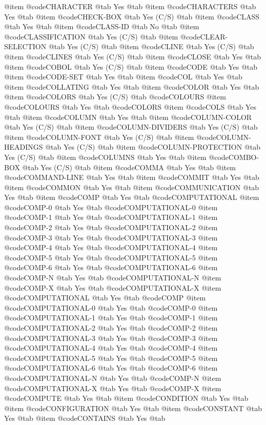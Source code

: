 @item @code{CHARACTER} @tab Yes @tab 
@item @code{CHARACTERS} @tab Yes @tab 
@item @code{CHECK-BOX} @tab Yes	(C/S) @tab 
@item @code{CLASS} @tab Yes @tab 
@item @code{CLASS-ID} @tab No @tab 
@item @code{CLASSIFICATION} @tab Yes	(C/S) @tab 
@item @code{CLEAR-SELECTION} @tab Yes	(C/S) @tab 
@item @code{CLINE} @tab Yes	(C/S) @tab 
@item @code{CLINES} @tab Yes	(C/S) @tab 
@item @code{CLOSE} @tab Yes @tab 
@item @code{COBOL} @tab Yes	(C/S) @tab 
@item @code{CODE} @tab Yes @tab 
@item @code{CODE-SET} @tab Yes @tab 
@item @code{COL} @tab Yes @tab 
@item @code{COLLATING} @tab Yes @tab 
@item @code{COLOR} @tab Yes @tab 
@item @code{COLORS} @tab Yes	(C/S) @tab @code{COLOURS}
@item @code{COLOURS} @tab Yes @tab @code{COLORS}
@item @code{COLS} @tab Yes @tab 
@item @code{COLUMN} @tab Yes @tab 
@item @code{COLUMN-COLOR} @tab Yes	(C/S) @tab 
@item @code{COLUMN-DIVIDERS} @tab Yes	(C/S) @tab 
@item @code{COLUMN-FONT} @tab Yes	(C/S) @tab 
@item @code{COLUMN-HEADINGS} @tab Yes	(C/S) @tab 
@item @code{COLUMN-PROTECTION} @tab Yes	(C/S) @tab 
@item @code{COLUMNS} @tab Yes @tab 
@item @code{COMBO-BOX} @tab Yes	(C/S) @tab 
@item @code{COMMA} @tab Yes @tab 
@item @code{COMMAND-LINE} @tab Yes @tab 
@item @code{COMMIT} @tab Yes @tab 
@item @code{COMMON} @tab Yes @tab 
@item @code{COMMUNICATION} @tab Yes @tab 
@item @code{COMP} @tab Yes @tab @code{COMPUTATIONAL}
@item @code{COMP-0} @tab Yes @tab @code{COMPUTATIONAL-0}
@item @code{COMP-1} @tab Yes @tab @code{COMPUTATIONAL-1}
@item @code{COMP-2} @tab Yes @tab @code{COMPUTATIONAL-2}
@item @code{COMP-3} @tab Yes @tab @code{COMPUTATIONAL-3}
@item @code{COMP-4} @tab Yes @tab @code{COMPUTATIONAL-4}
@item @code{COMP-5} @tab Yes @tab @code{COMPUTATIONAL-5}
@item @code{COMP-6} @tab Yes @tab @code{COMPUTATIONAL-6}
@item @code{COMP-N} @tab Yes @tab @code{COMPUTATIONAL-N}
@item @code{COMP-X} @tab Yes @tab @code{COMPUTATIONAL-X}
@item @code{COMPUTATIONAL} @tab Yes @tab @code{COMP}
@item @code{COMPUTATIONAL-0} @tab Yes @tab @code{COMP-0}
@item @code{COMPUTATIONAL-1} @tab Yes @tab @code{COMP-1}
@item @code{COMPUTATIONAL-2} @tab Yes @tab @code{COMP-2}
@item @code{COMPUTATIONAL-3} @tab Yes @tab @code{COMP-3}
@item @code{COMPUTATIONAL-4} @tab Yes @tab @code{COMP-4}
@item @code{COMPUTATIONAL-5} @tab Yes @tab @code{COMP-5}
@item @code{COMPUTATIONAL-6} @tab Yes @tab @code{COMP-6}
@item @code{COMPUTATIONAL-N} @tab Yes @tab @code{COMP-N}
@item @code{COMPUTATIONAL-X} @tab Yes @tab @code{COMP-X}
@item @code{COMPUTE} @tab Yes @tab 
@item @code{CONDITION} @tab Yes @tab 
@item @code{CONFIGURATION} @tab Yes @tab 
@item @code{CONSTANT} @tab Yes @tab 
@item @code{CONTAINS} @tab Yes @tab 
